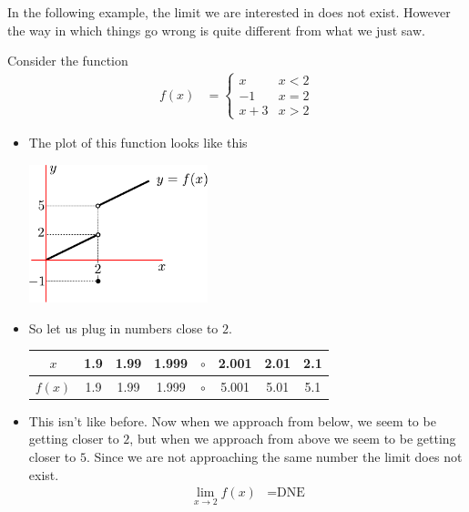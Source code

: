 In the following example, the limit we are interested in does not exist.
However the way in which things go wrong is quite different from what we just
saw.
\begin{eg}
Consider the function
\begin{align*}
  f(x) &= \begin{cases}
           x & x<2 \\
           -1 & x=2 \\
           x+3 & x>2
          \end{cases}
\end{align*}
\begin{itemize}
 \item The plot of this function looks like this
\begin{efig}
\begin{center}
 \includegraphics[height=4cm]{lim1}
\end{center}
\end{efig}
\item So let us plug in numbers close to $2$.
\begin{center}
 \begin{tabular}{|c||c|c|c|c|c|c|c|}
  \hline
  $x$ & 1.9 & 1.99 & 1.999 & $\circ$ & 2.001 & 2.01 & 2.1 \\
\hline
  $f(x)$ & 1.9 & 1.99 & 1.999 & $\circ$ & 5.001 & 5.01 & 5.1 \\
\hline
  \end{tabular}
\end{center}
\item This isn't like before. Now when we approach from below, we seem to be
getting closer to $2$, but when we approach from above we seem to be getting
closer to $5$. Since we are not approaching the same number the limit does not
exist.
\begin{align*}
  \lim_{x \to 2} f(x) &= \text{DNE}
\end{align*}
\end{itemize}
\end{eg}

